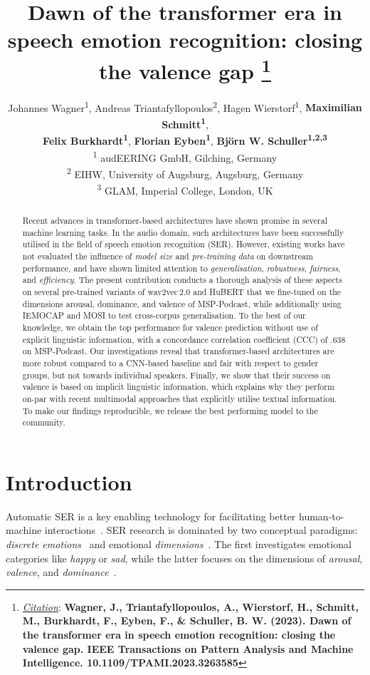 \documentclass{article}
\title{
Dawn of the transformer era in speech emotion recognition: closing the valence gap
\thanks{\textit{\underline{Citation}}: 
\textbf{Wagner, J., Triantafyllopoulos, A., Wierstorf, H., Schmitt, M., Burkhardt, F., Eyben, F., \& Schuller, B. W. (2023). Dawn of the transformer era in speech emotion recognition: closing the valence gap. IEEE Transactions on Pattern Analysis and Machine Intelligence. 10.1109/TPAMI.2023.3263585}} 
}
\author{
Johannes Wagner\textsuperscript{1}, Andreas Triantafyllopoulos\textsuperscript{2}, Hagen Wierstorf\textsuperscript{1}, \textbf{Maximilian Schmitt\textsuperscript{1}}, \\\textbf{Felix Burkhardt\textsuperscript{1}}, \textbf{Florian Eyben\textsuperscript{1}}, \textbf{Bj\"{o}rn W. Schuller\textsuperscript{1,2,3}}\\
\textsuperscript{1} audEERING GmbH, Gilching, Germany\\
\textsuperscript{2} EIHW, University of Augsburg, Augsburg, Germany\\
\textsuperscript{3} GLAM, Imperial College, London, UK\\
}
\newcommand\msppodcast{\mbox{MSP-Podcast}}
\newcommand\iemocap{\mbox{IEMOCAP}}
\newcommand\mosi{\mbox{MOSI}}
\newcommand{\wtov}{wav2vec\,2.0}
\newcommand{\hubert}{HuBERT}
\begin{document}
\maketitle

\begin{abstract}
    Recent advances in transformer-based architectures have shown promise in several machine learning tasks.
    In the audio domain, such architectures have been successfully utilised in the field of speech emotion recognition (SER).
    However, existing works have not evaluated the influence of \emph{model size} and \emph{pre-training data} on downstream performance, and have shown limited attention to \emph{generalisation}, \emph{robustness}, \emph{fairness}, and \emph{efficiency}.
    The present contribution conducts a thorough analysis of these aspects on several pre-trained variants of {\wtov} and {\hubert} that we fine-tuned on the dimensions arousal, dominance, and valence of {\msppodcast}, while additionally using {\iemocap} and {\mosi} to test cross-corpus generalisation.
    To the best of our knowledge, we obtain the top performance for valence prediction without use of explicit linguistic information, with a concordance correlation coefficient (CCC) of $.638$ on {\msppodcast}.
    Our investigations reveal that transformer-based architectures are more robust  compared to a CNN-based baseline and fair with respect to gender groups, but not towards individual speakers.
    Finally, we show that their success on valence is based on implicit linguistic information, which explains why they perform on-par with recent multimodal approaches that explicitly utilise textual information.
    To make our findings reproducible, we release the best performing model to the community.
\end{abstract}

\glsresetall


\section{Introduction}
\label{sec:introduction}

Automatic \ac{SER} is a key enabling technology for 
facilitating better human-to-machine interactions~\citep{Schuller18-SER}.
\ac{SER} research is dominated by two conceptual paradigms: \emph{discrete emotions}~\citep{ekman1992argument} and emotional \emph{dimensions}~\citep{russell1977evidence}.
The first investigates emotional categories like \emph{happy} or \emph{sad}, while the latter focuses on the dimensions of \emph{arousal}, \emph{valence}, and \emph{dominance}~\citep{russell1977evidence}.
\end{document}
